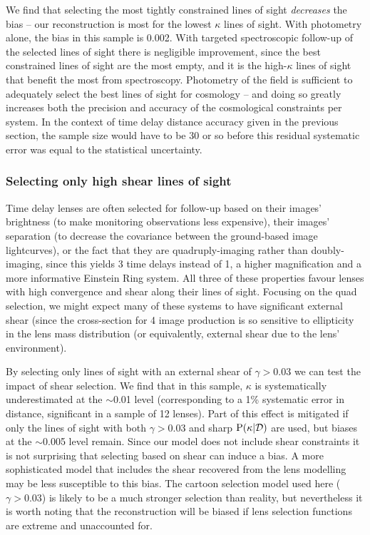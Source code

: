 \documentclass[useAMS,usenatbib]{mn2e}
\begin{document}
We find that selecting the most tightly constrained lines of sight {\it
decreases} the bias -- our reconstruction is most \succesful for the lowest
$\kappa$ lines of sight. With photometry alone, the bias in this sample is
0.002. With targeted spectroscopic follow-up of the selected lines of sight
there is negligible improvement, since the best constrained lines of sight are
the most empty, and it is the high-$\kappa$ lines of sight that benefit the
most from spectroscopy. Photometry of the field is sufficient to adequately
select the best lines of sight for cosmology -- and doing so greatly increases
both the precision and accuracy of the cosmological constraints per system.
In the context of time delay distance accuracy given in the previous section,
the sample size would have to be 30 or so before this residual systematic
error was equal to the statistical uncertainty.


\subsubsection{Selecting only high shear lines of sight}
\label{sec:bias:tightPDF}

Time delay lenses are often selected for follow-up based on their images'
brightness (to make monitoring observations less expensive), their images'
separation (to decrease the covariance between the ground-based image
lightcurves), or the fact that they are quadruply-imaging rather than
doubly-imaging, since this yields 3 time delays instead of 1, a higher
magnification and a more informative Einstein Ring system. All three of these
properties favour lenses with high convergence and shear along their lines of
sight. Focusing on the quad selection, we might expect many of these systems
to have significant external shear (since the cross-section for 4 image
production is so sensitive to ellipticity in the lens mass distribution (or
equivalently, external shear due to the lens' environment). 

By selecting only lines of sight with an external shear of $\gamma>0.03$ we
can test the impact of shear selection. We find that in this sample, $\kappa$
is systematically underestimated at the $\sim$0.01 level (corresponding to a
1\% systematic error in distance, significant in a sample of 12 lenses). 
Part of this effect is mitigated if only
the lines of sight with both $\gamma>0.03$ and sharp ${\rm P}(\kappa|{\mathcal{D}})$ are
used, but biases at the $\sim$0.005 level remain. Since our model does not
include shear constraints it is not surprising that selecting based on shear
can induce a bias. A more sophisticated model that includes the shear
recovered from the lens modelling may be less susceptible to this bias. The
cartoon selection model used here ($\gamma>0.03$) is likely to be a much
stronger selection than reality, but nevertheless it is worth noting that the
reconstruction \proceedure will be biased if lens selection functions are
extreme and unaccounted for.
\end{document}
